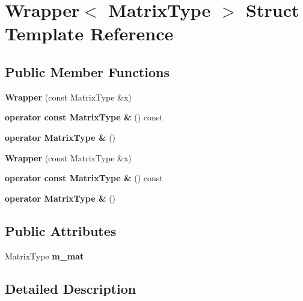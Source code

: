 \hypertarget{struct_wrapper}{}\section{Wrapper$<$ Matrix\+Type $>$ Struct Template Reference}
\label{struct_wrapper}
\subsection*{Public Member Functions}
\begin{DoxyCompactItemize}
\item 
\mbox{\label{struct_wrapper_a93534e77efb9af0be6d969256de8d333}} 
{\bfseries Wrapper} (const Matrix\+Type \&x)
\item 
\mbox{\label{struct_wrapper_aaaf9870f03957159de835c8864c23a32}} 
{\bfseries operator const Matrix\+Type \&} () const
\item 
\mbox{\label{struct_wrapper_a3344047e986b49d8e2a61457bab8f85e}} 
{\bfseries operator Matrix\+Type \&} ()
\item 
\mbox{\label{struct_wrapper_a93534e77efb9af0be6d969256de8d333}} 
{\bfseries Wrapper} (const Matrix\+Type \&x)
\item 
\mbox{\label{struct_wrapper_aaaf9870f03957159de835c8864c23a32}} 
{\bfseries operator const Matrix\+Type \&} () const
\item 
\mbox{\label{struct_wrapper_a3344047e986b49d8e2a61457bab8f85e}} 
{\bfseries operator Matrix\+Type \&} ()
\end{DoxyCompactItemize}
\subsection*{Public Attributes}
\begin{DoxyCompactItemize}
\item 
\mbox{\label{struct_wrapper_a71eea6396e6df0cd58033640ec566ef3}} 
Matrix\+Type {\bfseries m\+\_\+mat}
\end{DoxyCompactItemize}


\subsection{Detailed Description}
